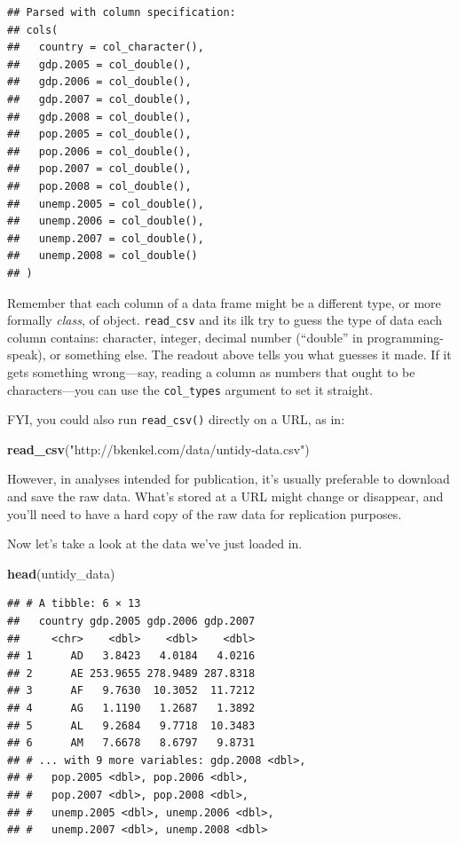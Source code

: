 \documentclass[12pt,oneside,openany]{tufte-book}
\newenvironment{Shaded}{}{}
\newcommand{\KeywordTok}[1]{\textcolor[rgb]{0.00,0.44,0.13}{\textbf{{#1}}}}
\newcommand{\StringTok}[1]{\textcolor[rgb]{0.25,0.44,0.63}{{#1}}}
\newcommand{\NormalTok}[1]{{#1}}
\begin{document}
\begin{verbatim}
## Parsed with column specification:
## cols(
##   country = col_character(),
##   gdp.2005 = col_double(),
##   gdp.2006 = col_double(),
##   gdp.2007 = col_double(),
##   gdp.2008 = col_double(),
##   pop.2005 = col_double(),
##   pop.2006 = col_double(),
##   pop.2007 = col_double(),
##   pop.2008 = col_double(),
##   unemp.2005 = col_double(),
##   unemp.2006 = col_double(),
##   unemp.2007 = col_double(),
##   unemp.2008 = col_double()
## )
\end{verbatim}

Remember that each column of a data frame might be a different type, or
more formally \emph{class}, of object. \texttt{read\_csv} and its ilk
try to guess the type of data each column contains: character, integer,
decimal number (``double'' in programming-speak), or something else. The
readout above tells you what guesses it made. If it gets something
wrong---say, reading a column as numbers that ought to be
characters---you can use the \texttt{col\_types} argument to set it
straight.

FYI, you could also run \texttt{read\_csv()} directly on a URL, as in:

\begin{Shaded}
\begin{Highlighting}[]
\KeywordTok{read_csv}\NormalTok{(}\StringTok{"http://bkenkel.com/data/untidy-data.csv"}\NormalTok{)}
\end{Highlighting}
\end{Shaded}

However, in analyses intended for publication, it's usually preferable
to download and save the raw data. What's stored at a URL might change
or disappear, and you'll need to have a hard copy of the raw data for
replication purposes.

Now let's take a look at the data we've just loaded in.

\begin{Shaded}
\begin{Highlighting}[]
\KeywordTok{head}\NormalTok{(untidy_data)}
\end{Highlighting}
\end{Shaded}

\begin{verbatim}
## # A tibble: 6 × 13
##   country gdp.2005 gdp.2006 gdp.2007
##     <chr>    <dbl>    <dbl>    <dbl>
## 1      AD   3.8423   4.0184   4.0216
## 2      AE 253.9655 278.9489 287.8318
## 3      AF   9.7630  10.3052  11.7212
## 4      AG   1.1190   1.2687   1.3892
## 5      AL   9.2684   9.7718  10.3483
## 6      AM   7.6678   8.6797   9.8731
## # ... with 9 more variables: gdp.2008 <dbl>,
## #   pop.2005 <dbl>, pop.2006 <dbl>,
## #   pop.2007 <dbl>, pop.2008 <dbl>,
## #   unemp.2005 <dbl>, unemp.2006 <dbl>,
## #   unemp.2007 <dbl>, unemp.2008 <dbl>
\end{verbatim}
\end{document}
